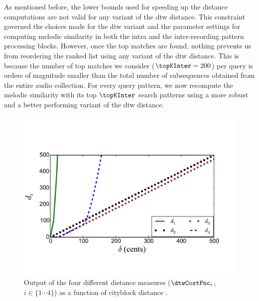 As mentioned before, the lower bounds used for speeding up the distance computations are not valid for any variant of the \gls{dtw} distance. This constraint governed the choices made for the \gls{dtw} variant and the parameter settings for computing melodic similarity in both the intra and the inter-recording pattern processing blocks. However, once the top matches are found, nothing prevents us from reordering the ranked list using any variant of the \gls{dtw} distance. This is because the number of top matches we consider ($\topKInter=200$) per query is orders of magnitude smaller than the total number of subsequences obtained from the entire audio collection. For every query pattern, we now recompute the melodic similarity with its top $\topKInter$ search patterns using a more robust and a better performing variant of the \gls{dtw} distance.

\begin{figure}
	\begin{center}
		\includegraphics[width=\figSizeEighty]{ch06_patterns/figures/discovery/distances.pdf}
	\end{center}
	\caption[Illustration of output of different distance measures]{Output of the four different distance measures ($\dtwCostFnc_i$, $i \in \lbrace 1\cdots4 \rbrace$) as a function of cityblock distance \pitchDiff.}
	\label{fig:Distances_DTW_discovery}
\end{figure}

